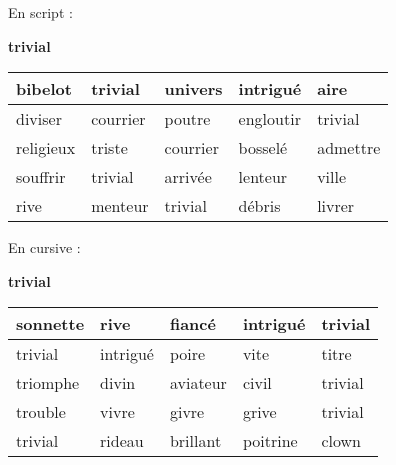 \documentclass[a4paper, 11pt,oneside, fleqn]{article}
\begin{document}
\begin{onehalfspace}
\large\noindent En script :
\begin{center} {\huge \textbf{trivial}}
\vspace{0.25cm}\\
\begin{tabulary}{17cm}{|h|h|h|h|h|}
\hline
bibelot & trivial & univers & intrigué & aire \\
\hline
diviser & courrier & poutre & engloutir & trivial \\
\hline
religieux & triste & courrier & bosselé & admettre \\
\hline
souffrir & trivial & arrivée & lenteur & ville \\
\hline
rive & menteur & trivial & débris & livrer \\
\hline
\end{tabulary}
\end{center}
\vspace{0.5cm}

\large\noindent En cursive :
\begin{center}
{\huge \textbf {{\cursive trivial}}}
\vspace{0.25cm}\\
\begin{tabulary}{17cm}{|i|i|i|i|i|}
\hline
sonnette & rive & fiancé & intrigué & trivial \\
\hline
trivial & intrigué & poire & vite & titre \\
\hline
triomphe & divin & aviateur & civil & trivial \\
\hline
trouble & vivre & givre & grive & trivial \\
\hline
trivial & rideau & brillant & poitrine & clown \\
\hline
\end{tabulary}
\end{center}

\end{onehalfspace}
\end{document}
